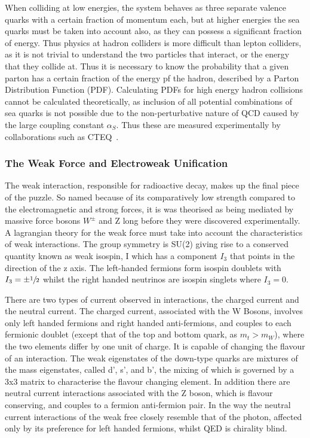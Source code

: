  When colliding at low energies, the system behaves as three separate valence quarks with a certain fraction of momentum each, but at higher energies the sea quarks must be taken into account also, as they can possess a significant fraction of energy.  Thus physics at hadron colliders is more difficult than lepton colliders, as it is not trivial to understand the two particles that interact, or the energy that they collide at. Thus it is necessary to know the probability that a given parton has a certain fraction of the energy pf the hadron,  described by a Parton Distribution Function (PDF). Calculating PDFs for high energy hadron collisions cannot be calculated theoretically, as inclusion of all potential combinations of sea quarks is not possible due to the non-perturbative nature of QCD caused by the large coupling constant $\alpha_{S}$. Thus these are measured experimentally by collaborations such as CTEQ~\cite{CTEQ}. 
 


\subsubsection{The Weak Force and Electroweak Unification}

The weak interaction, responsible for radioactive decay, makes up the final piece of the puzzle. So named because of its comparatively low strength compared to the electromagnetic and strong forces, it is was theorised as being mediated by massive force bosons $W^{\pm}$ and Z long before they were discovered experimentally. A lagrangian theory for the weak force must take into account the characteristics of weak interactions. The group symmetry is SU(2) giving rise to a conserved quantity known as weak isospin, I which has a component $I_{3}$ that points in the direction of the z axis. The left-handed fermions form isospin doublets with $I_{3} = \pm \sfrac{1}{2}$ whilst the right handed neutrinos are isospin singlets where $I_{3} = 0$.

There are two types of current observed in interactions, the charged current and the neutral current\cite{PichSM}. The charged current, associated with the W Bosons, involves only left handed fermions and right handed anti-fermions, and couples to each fermionic doublet (except that of the top and bottom quark, as $m_{t} > m_{W}$), where the two elements differ by one unit of charge. It is capable of changing the flavour of an interaction. The weak eigenstates of the down-type quarks are mixtures of the mass eigenstates, called d', s', and b', the mixing of which is governed by a 3x3 matrix to characterise the flavour changing element.  In addition there are neutral current interactions associated with the Z boson, which is flavour conserving, and couples to a fermion anti-fermion pair. In the way the neutral current interactions of the weak free closely resemble that of the photon, affected only by its preference for left handed fermions, whilst QED is chirality blind. 

